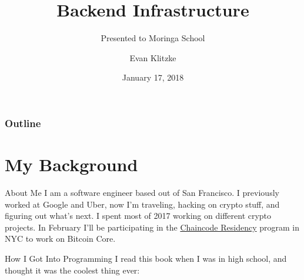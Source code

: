\documentclass[14pt]{beamer}
\title{Backend Infrastructure}
\subtitle{Presented to Moringa School}
\author{Evan Klitzke}
\date{January 17, 2018}
\begin{document}
\begin{frame}
  \titlepage
\end{frame}


\begin{frame}
\frametitle{Outline}
  \tableofcontents
\end{frame}

\section{My Background}

\begin{frame}{About Me}
  I am a software engineer based out of San Francisco. I previously worked at
  Google and Uber, now I'm traveling, hacking on crypto stuff, and figuring out
  what's next.
  \newline
  \newline
  I spent most of 2017 working on different crypto projects. In February I'll be
  participating in the \href{https://hackerresidency.com}{Chaincode Residency}
  program in NYC to work on Bitcoin Core.
\end{frame}

\begin{frame}{How I Got Into Programming}
  I read this book when I was in high school, and thought it was the coolest
  thing ever:
  \newline
  \newline
\end{frame}
\end{document}
